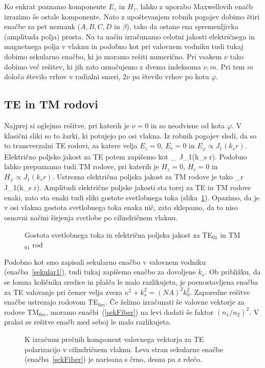 Ko enkrat poznamo komponente $E_z$ in $H_z$, lahko z uporabo Maxwellovih enačb izrazimo še ostale
komponente. Nato z upoštevanjem robnih pogojev dobimo štiri enačbe za pet neznank ($A,B,C,D$ in $\beta$),
tako da ostane ena spremenljivka (amplituda polja) prosta. Na ta način izračunamo celotni 
jakosti električnega in magnetnega polja v vlaknu in podobno kot pri valovnem vodniku 
tudi tukaj dobimo sekularno enačbo, ki jo moramo rešiti numerično. Pri vsakem $\nu$ tako dobimo več
rešitev, ki jih zato označujemo z dvema indeksoma $\nu,m$. Pri tem $m$ določa število vrhov v
radialni smeri, $2\nu$ pa število vrhov po kotu $\varphi$. 

\subsection*{TE in TM rodovi}
Najprej si oglejmo rešitve, pri katerih je $\nu=0$ in so neodvisne od kota $\varphi$. 
V klasični sliki so to žarki, ki potujejo
po osi vlakna. Iz robnih pogojev sledi, da 
so to transverzalni TE rodovi, za katere velja $E_z=0$, $E_r=0$ in $E_\varphi \propto J_1(k_sr)$.
Električno poljsko jakost za TE potem zapišemo kot 
\beq
{} \propto {}_\varphi \, J_1(k_s r).
\eeq
Podobno lahko prepoznamo tudi TM rodove, pri katerih je $H_z=0$, $H_r=0$ in $H_\varphi \propto J_1(k_sr)$.
Ustrezna električna poljska jakost za TM rodove je tako 
\beq
{} \propto {}_r \, J_1(k_s r).
\eeq
Amplitudi električne poljske jakosti sta torej za TE in TM rodove enaki, zato
sta enaki tudi sliki gostote svetlobnega toka (slika~\ref{fig:TE01}). Opazimo, da je v osi
vlakna gostota svetlobnega toka enaka nič, zato sklepamo, da to niso osnovni načini 
širjenja svetlobe po cilindričnem vlaknu. 
\begin{figure}[h]
\centering
\def\svgwidth{100truemm} 

\caption{Gostota svetlobnega toka in električna poljska jakost za TE$_{01}$ in TM$_{01}$ rod}
\label{fig:TE01}
\end{figure}

Podobno kot smo zapisali sekularno enačbo v valovnem vodniku (enačba~\ref{sekular1}), tudi tukaj
zapišemo enačbo za dovoljene $k_s$. 
Ob približku, da se lomna količnika 
sredice in plašča le malo razlikujeta, je poenostavljena enačba za TE valovanje
pri čemer velja zveza $\kappa^2+k_s^2=(NA)^2k_0^2$. Zaporedne rešitve enačbe ustrezajo rodovom TE$_{0m}$. 
Če želimo izračunati še valovne vektorje za rodove TM$_{0m}$, moramo enačbi~(\ref{sekFiber}) na levi 
dodati še faktor $(n_1/n_2)^2$. V praksi se rešitve enačb med seboj le malo razlikujeta.
\begin{figure}[h]
\centering
\def\svgwidth{90truemm} 

\caption{K izračunu prečnih komponent valovnega vektorja za TE polarizacijo v cilindričnem vlaknu.
Leva stran sekularne enačbe (enačba~\ref{sekFiber}) je narisana s črno, desna pa z rdečo.}
\label{fig:TEsecFib}
\end{figure} 

